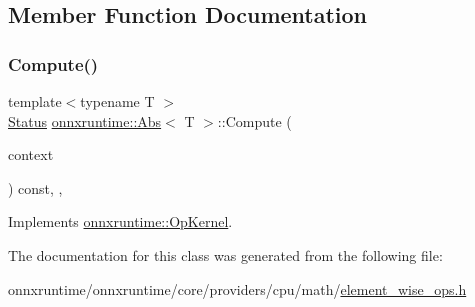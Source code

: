 \subsection{Member Function Documentation}
\mbox{\label{classonnxruntime_1_1Abs_ada4b4f47bbdd82a1e6e5180636c3e7a3}} 
\subsubsection{\texorpdfstring{Compute()}{Compute()}}
{\footnotesize\ttfamily template$<$typename T $>$ \\
\mbox{\hyperlink{classonnxruntime_1_1common_1_1Status}{Status}} \mbox{\hyperlink{classonnxruntime_1_1Abs}{onnxruntime\+::\+Abs}}$<$ T $>$\+::Compute (\begin{DoxyParamCaption}\item[{\mbox{\hyperlink{classonnxruntime_1_1OpKernelContext}{Op\+Kernel\+Context}} $\ast$}]{context }\end{DoxyParamCaption}) const\hspace{0.3cm}{\ttfamily [inline]}, {\ttfamily [override]}, {\ttfamily [virtual]}}



Implements \mbox{\hyperlink{classonnxruntime_1_1OpKernel_a9eca8656a78b1b3ab9d3351a12798650}{onnxruntime\+::\+Op\+Kernel}}.



The documentation for this class was generated from the following file\+:\begin{DoxyCompactItemize}
\item 
onnxruntime/onnxruntime/core/providers/cpu/math/\mbox{\hyperlink{element__wise__ops_8h}{element\+\_\+wise\+\_\+ops.\+h}}\end{DoxyCompactItemize}
